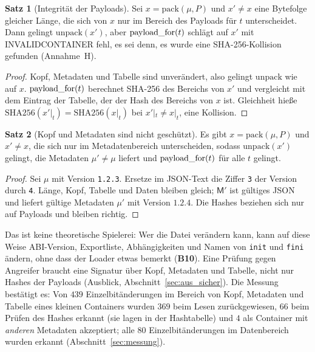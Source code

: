 \documentclass[a4paper,12pt,twoside]{report}
\DeclareRobustCommand{\_}{\ifmmode\mbox{\textunderscore}\else\textunderscore\allowbreak{}\fi}
\theoremstyle{definition}
\newtheorem{satz}{Satz}[chapter]
\newcommand{\Bf}[1]{\textbf{B#1}}
\begin{document}
\begin{satz}[Integrität der Payloads]
	\label{satz:integritaet}
	Sei $x=\mathrm{pack}(\mu,P)$ und $x'\ne x$ eine Bytefolge gleicher Länge, die sich von $x$ nur im Bereich des Payloads für $t$ unterscheidet. Dann gelingt $\mathrm{unpack}(x')$, aber $\mathrm{payload\_for}(t)$ schlägt auf $x'$ mit INVALID\_CONTAINER fehl, es sei denn, es wurde eine SHA-256-Kollision gefunden (Annahme~H).
\end{satz}

\begin{proof}
	Kopf, Metadaten und Tabelle sind unverändert, also gelingt $\mathrm{unpack}$ wie auf $x$. $\mathrm{payload\_for}(t)$ berechnet SHA-256 des Bereichs von $x'$ und vergleicht mit dem Eintrag der Tabelle, der der Hash des Bereichs von $x$ ist. Gleichheit hieße $\mathrm{SHA256}(x'|_t)=\mathrm{SHA256}(x|_t)$ bei $x'|_t\ne x|_t$, eine Kollision.
\end{proof}

\begin{satz}[Kopf und Metadaten sind nicht geschützt]
	\label{satz:authentizitaet}
	Es gibt $x=\mathrm{pack}(\mu,P)$ und $x'\ne x$, die sich nur im Metadatenbereich unterscheiden, sodass $\mathrm{unpack}(x')$ gelingt, die Metadaten $\mu'\ne\mu$ liefert und $\mathrm{payload\_for}(t)$ für alle $t$ gelingt.
\end{satz}

\begin{proof}
	Sei $\mu$ mit Version \texttt{1.2.3}. Ersetze im JSON-Text die Ziffer \texttt{3} der Version durch \texttt{4}. Länge, Kopf, Tabelle und Daten bleiben gleich; $\mathsf M'$ ist gültiges JSON und liefert gültige Metadaten $\mu'$ mit Version $1.2.4$. Die Hashes beziehen sich nur auf Payloads und bleiben richtig.
\end{proof}

Das ist keine theoretische Spielerei: Wer die Datei verändern kann, kann auf diese Weise ABI-Version, Exportliste, Abhängigkeiten und Namen von \texttt{init} und \texttt{fini} ändern, ohne dass der Loader etwas bemerkt (\Bf{10}). Eine Prüfung gegen Angreifer braucht eine Signatur über Kopf, Metadaten und Tabelle, nicht nur Hashes der Payloads (Ausblick, Abschnitt~\ref{sec:aus_sicher}). Die Messung bestätigt es: Von $439$ Einzelbitänderungen im Bereich von Kopf, Metadaten und Tabelle eines kleinen Containers wurden $369$ beim Lesen zurückgewiesen, $66$ beim Prüfen des Hashes erkannt (sie lagen in der Hashtabelle) und $4$ als Container mit \emph{anderen} Metadaten akzeptiert; alle $80$ Einzelbitänderungen im Datenbereich wurden erkannt (Abschnitt~\ref{sec:messung}).
\end{document}
